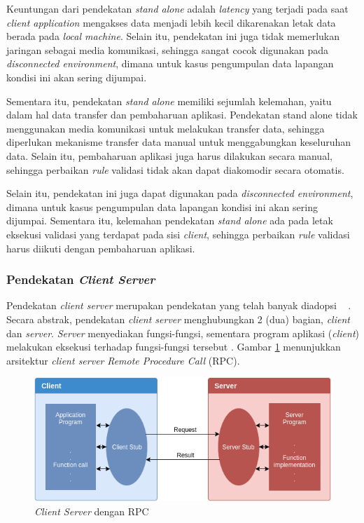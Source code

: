 Keuntungan dari pendekatan \textit{stand alone} adalah \textit{latency} yang terjadi pada saat \textit{client application} mengakses data menjadi lebih kecil dikarenakan letak data berada pada \textit{local machine}. Selain itu, pendekatan ini juga tidak memerlukan jaringan sebagai media komunikasi, sehingga sangat cocok digunakan pada \textit{disconnected environment}, dimana untuk kasus pengumpulan data lapangan kondisi ini akan sering dijumpai.


Sementara itu, pendekatan \textit{stand alone} memiliki sejumlah kelemahan, yaitu dalam hal data transfer dan pembaharuan aplikasi. Pendekatan stand alone tidak menggunakan media komunikasi untuk melakukan transfer data, sehingga diperlukan mekanisme transfer data manual untuk menggabungkan keseluruhan data. Selain itu, pembaharuan aplikasi juga harus dilakukan secara manual, sehingga perbaikan \textit{rule} validasi tidak akan dapat diakomodir secara otomatis.


Selain itu, pendekatan ini juga dapat digunakan pada \textit{disconnected environment}, dimana untuk kasus pengumpulan data lapangan kondisi ini akan sering dijumpai. Sementara itu, kelemahan pendekatan \textit{stand alone} ada pada letak eksekusi validasi yang terdapat pada sisi \textit{client}, sehingga perbaikan \textit{rule} validasi harus diikuti dengan pembaharuan aplikasi.


\subsubsection{Pendekatan \textit{Client Server}} \label{sssec:client-server}

Pendekatan \textit{client server} merupakan pendekatan yang telah banyak diadopsi \cite{schuster_client/server_1994} ~\cite{bertocco_client-server_1998} \cite{callaghan_clientserver_2007}. Secara abstrak, pendekatan \textit{client server} menghubungkan 2 (dua) bagian, \textit{client} dan \textit{server}. \textit{Server} menyediakan fungsi-fungsi, sementara program aplikasi (\textit{client}) melakukan eksekusi terhadap fungsi-fungsi tersebut \cite{schuster_client/server_1994}. Gambar \ref{fig:design-client-server-rpc} menunjukkan arsitektur \textit{client server} \textit{Remote Procedure Call} (RPC).

\begin{figure}[h]
    \centering
    \includegraphics[width=.7\textwidth]{../../Resources/Images/design-client-server-rpc}
    \caption{\textit{Client Server} dengan RPC \cite{schuster_client/server_1994}}
    \label{fig:design-client-server-rpc}
\end{figure}


